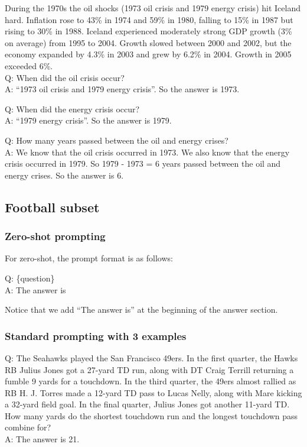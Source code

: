 During the 1970s the oil shocks (1973 oil crisis and 1979 energy crisis) hit Iceland hard. Inflation rose to 43\% in 1974 and 59\% in 1980, falling to 15\% in 1987 but rising to 30\% in 1988. Iceland experienced moderately strong GDP growth (3\% on average) from 1995 to 2004. Growth slowed between 2000 and 2002, but the economy expanded by 4.3\% in 2003 and grew by 6.2\% in 2004. Growth in 2005 exceeded 6\%. \\
Q: When did the oil crisis occur?\\
A: ``1973 oil crisis and 1979 energy crisis''. So the answer is 1973.

Q: When did the energy crisis occur?\\
A: ``1979 energy crisis''. So the answer is 1979.

Q: How many years passed between the oil and energy crises?\\
A: We know that the oil crisis occurred in 1973. We also know that the energy crisis occurred in 1979. So 1979 - 1973 = 6 years passed between the oil and energy crises. So the answer is 6.

\subsection{Football subset}
\label{sec:drop-football}

\subsubsection{Zero-shot prompting}
For zero-shot, the prompt format is as follows:

Q: \{question\}\\
A: The answer is

Notice that we add ``The answer is'' at the beginning of the answer section.

\subsubsection{Standard prompting with 3 examples}

Q: The Seahawks played the San Francisco 49ers. In the first quarter, the Hawks RB Julius Jones got a 27-yard TD run, along with DT Craig Terrill returning a fumble 9 yards for a touchdown. In the third quarter, the 49ers almost rallied as RB H. J. Torres made a 12-yard TD pass to Lucas Nelly, along with Mare kicking a 32-yard field goal. In the final quarter, Julius Jones got another 11-yard TD. How many yards do the shortest touchdown run and the longest touchdown pass combine for?\\
A: The answer is 21.

